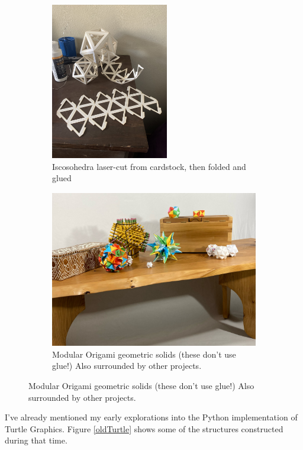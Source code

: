 \documentclass[12pt,twoside]{reedthesis}
\begin{document}
	\begin{figure}[h]
	\centering
	\begin{subfigure}{0.38\linewidth}
		\centering
		\includegraphics[height=2.7in]{Images/Icosohedra}
		\caption{Iscosohedra laser-cut from cardstock, then folded and glued}
		\label{icosohedra}
	\end{subfigure}
	\hfill
	\begin{subfigure}{0.58\linewidth}
		\centering
		\includegraphics[height=2.7in]{Images/PaperShapes}
		\caption{Modular Origami geometric solids (these don't use glue!) Also surrounded by other projects.}
		\label{papershapes}
	\end{subfigure}
	\end{figure}
	
	
	I've already mentioned my early explorations into the Python implementation of Turtle Graphics. Figure \ref{oldTurtle} shows some of the structures constructed during that time.
	
\end{document}
